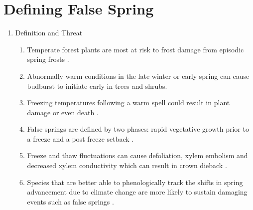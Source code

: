 \documentclass{article}\usepackage[]{graphicx}\usepackage[]{color}
\begin{document}
\section*{Defining False Spring}
\begin{enumerate}
\item Definition and Threat
\begin{enumerate}
\item Temperate forest plants are most at risk to frost damage from episodic spring frosts  \citep{Sakai1987}. 
\item Abnormally warm conditions in the late winter or early spring can cause budburst to initiate early in trees and shrubs.
\item Freezing temperatures following a warm spell could result in plant damage or even death \citep{Ludlum1968, Mock2007}.
\item False springs are defined by two phases: rapid vegetative growth prior to a freeze and a post freeze setback \citep{Gu2008}.
\item Freeze and thaw fluctuations can cause defoliation, xylem embolism and decreased xylem conductivity which can result in crown dieback \citep{Gu2008}.
\item Species that are better able to phenologically track the shifts in spring advancement due to climate change are more likely to sustain damaging events such as false springs \citep{Scheifinger2003}.
\end {enumerate}


\end{enumerate}
\end{document}
